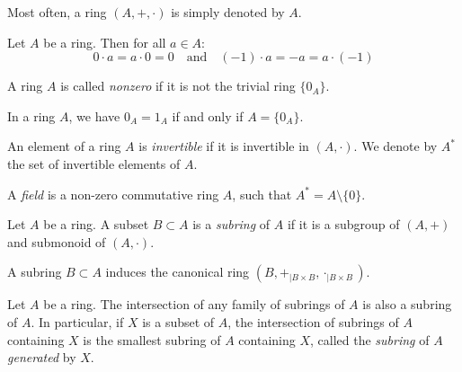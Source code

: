 \documentclass[12pt]{report}
\begin{document}
\begin{notation} \label{not-ring}
    Most often, a ring $(A, +, \cdot)$ is simply denoted by $A$.
\end{notation}

\begin{remark}
    Let $A$ be a ring. Then for all $a \in A$:
    \[
        0 \cdot a = a \cdot 0 = 0 \quad \text{and} \quad (-1) \cdot a = -a = a \cdot (-1)
    \]
\end{remark}

\begin{definition} \label{def-nonzero-ring}
    A ring $A$ is called \emph{nonzero} if it is not the trivial ring $\lbrace 0_{A} \rbrace$.
\end{definition}

\begin{remark} \label{rem-ring-trivial-ring}
    In a ring $A$, we have $0_{A} = 1_{A}$ if and only if $A = \lbrace 0_{A} \rbrace$.
\end{remark}

\begin{definition} \label{def-ring-invertible}
    An element of a ring $A$ is \emph{invertible} if it is invertible in $(A, \cdot)$. We denote by $A^{\ast}$ the set of invertible elements of $A$.
\end{definition}

\begin{definition} \label{def-ring-field}
    A \emph{field} is a non-zero commutative ring $A$, such that $A^{\ast} = A \setminus \lbrace 0 \rbrace$.
\end{definition}

\begin{definition} \label{def-ring-subring}
    Let $A$ be a ring. A subset $B \subset A$ is a \emph{subring} of $A$ if it is a subgroup of $(A, +)$ and submonoid of $(A, \cdot)$.
\end{definition}

\begin{remark}
    A subring $B \subset A$ induces the canonical ring $(B, +_{\vert B \times B}, \cdot_{\vert B \times B})$.
\end{remark}

\begin{proposition} \label{prop-ring-generated}
    Let $A$ be a ring. The intersection of any family of subrings of $A$ is also a subring of $A$. In particular, if $X$ is a subset of $A$, the intersection of subrings of $A$ containing $X$ is the smallest subring of $A$ containing $X$, called the \emph{subring} of $A$ \emph{generated} by $X$.
\end{proposition}
\end{document}
